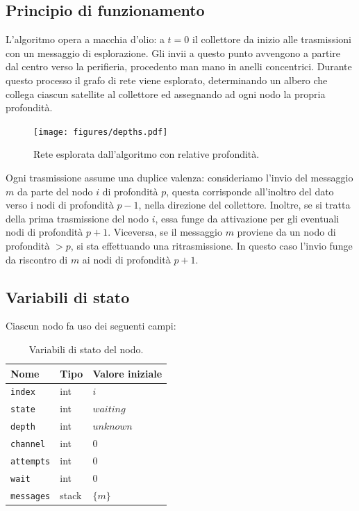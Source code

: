 \documentclass[a4paper,11pt]{article}
\theoremstyle{definition}
\begin{document}
\subsection{Principio di funzionamento}

L'algoritmo opera a macchia d'olio: a $t=0$ il collettore da inizio alle trasmissioni con un messaggio di esplorazione. Gli invii a questo punto avvengono a partire dal centro verso la perifieria, procedento man mano in anelli concentrici. Durante questo processo il grafo di rete viene esplorato, determinando un albero che collega ciascun satellite al collettore ed assegnando ad ogni nodo la propria profondità.

\begin{figure}[H]
\centering
\texttt{[image: figures/depths.pdf]}
\caption{Rete esplorata dall'algoritmo con relative profondità.}
\end{figure}

Ogni trasmissione assume una duplice valenza: consideriamo l'invio del messaggio $m$ da parte del nodo $i$ di profondità $p$, questa corrisponde all'inoltro del dato verso i nodi di profondità $p-1$, nella direzione del collettore. Inoltre, se si tratta della prima trasmissione del nodo $i$, essa funge da attivazione per gli eventuali nodi di profondità $p+1$. Viceversa, se il messaggio $m$ proviene da un nodo di profondità $> p$, si sta effettuando una ritrasmissione. In questo caso l'invio funge da riscontro di $m$ ai nodi di profondità $p+1$.

\subsection{Variabili di stato}

Ciascun nodo fa uso dei seguenti campi:

\begin{table}[H]
\centering
\begin{tabular}{| l | l | l |}
\multicolumn{1}{l}{Nome} &
\multicolumn{1}{l}{Tipo} &
\multicolumn{1}{l}{Valore iniziale} \\ \hline
\texttt{index} & int & $i$ \\ \hline
\texttt{state} & int & $waiting$ \\ \hline
\texttt{depth} & int & $unknown$ \\ \hline
\texttt{channel} & int & $0$ \\ \hline
\texttt{attempts} & int & $0$ \\ \hline
\texttt{wait} & int & $0$ \\ \hline
\texttt{messages} & stack & $\{m\}$ \\ \hline
\end{tabular}
\caption{Variabili di stato del nodo.}
\end{table}
\end{document}
